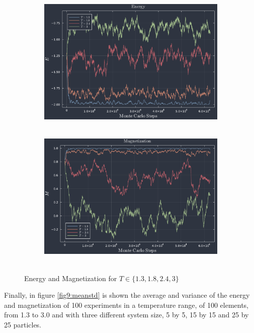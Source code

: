 \documentclass[main.tex]{subfiles}
\begin{document}
\begin{figure}
    \centering
    \begin{subfigure}[c]{0.45\textwidth}
        \includegraphics[width=\textwidth]{imgs/hw7/energyN25MOnteCarlosteps.pdf}
        \caption{~}\label{fig9:energyMagnetization_a}
    \end{subfigure}
    \begin{subfigure}[c]{0.45\textwidth}
        \includegraphics[width=\textwidth]{imgs/hw7/magnetizationN25MOnteCarlosteps.pdf}
        \caption{~}\label{fig9:energyMagnetization_b}
    \end{subfigure}
    \caption{Energy and Magnetization for $T\in\{1.3,1.8,2.4,3\}$}
    \label{fig9:energyMagnetization}
\end{figure}

Finally, in figure \ref{fig9:meanstd} is shown the average and variance of the energy and magnetization of 100 experiments in a temperature range, of 100 elements, from \num{1.3} to \num{3.0} and with three different system size, 5 by 5, 15 by 15 and 25 by 25 particles. 
\end{document}
